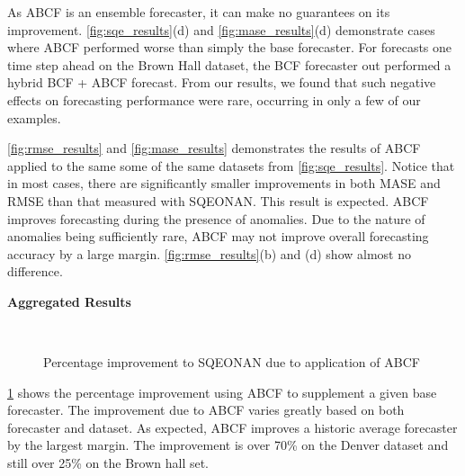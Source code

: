 As ABCF is an ensemble forecaster, it can make no guarantees on its improvement.  \ref{fig:sqe_results}(d) and \ref{fig:mase_results}(d) demonstrate cases where ABCF performed worse than simply the base forecaster.  For forecasts one time step ahead on the Brown Hall dataset, the BCF forecaster out performed a hybrid BCF + ABCF forecast.  From our results, we found that such negative effects on forecasting performance were rare, occurring in only a few of our examples.

\ref{fig:rmse_results} and \ref{fig:mase_results} demonstrates the results of ABCF applied to the same some of the same datasets from \ref{fig:sqe_results}.  Notice that in most cases, there are significantly smaller improvements in both MASE and RMSE than that measured with SQEONAN.  This result is expected.  ABCF improves forecasting during the presence of anomalies.  Due to the nature of anomalies being sufficiently rare, ABCF may not improve overall forecasting accuracy by a large margin.  \ref{fig:rmse_results}(b) and (d) show almost no difference.  

\newpage



\bigskip
\noindent \textbf{Aggregated Results} 

\begin{figure}[!b]
	\begin{center}
		 \\
	\end{center}
	\caption{Percentage improvement to SQEONAN due to application of ABCF}
	\label{fig:sqe_improvement_dataset}
\end{figure}

\ref{fig:sqe_improvement_dataset} shows the percentage improvement using ABCF to supplement a given base forecaster.  The improvement due to ABCF varies greatly based on both forecaster and dataset.  As expected, ABCF improves a historic average forecaster by the largest margin.  The improvement is over 70\% on the Denver dataset and still over 25\% on the Brown hall set.

